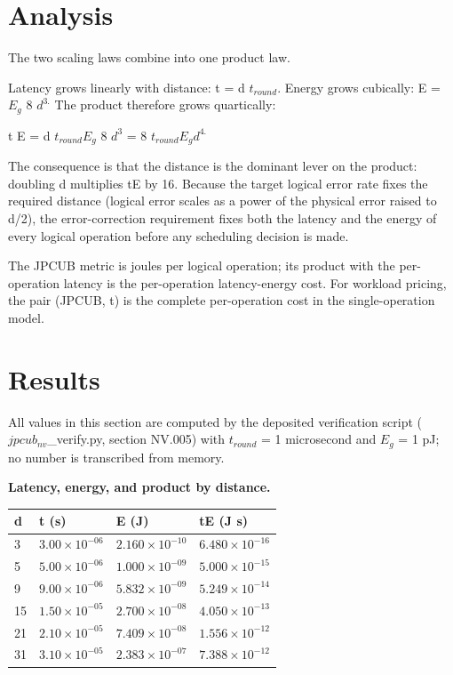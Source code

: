 \documentclass[11pt]{article}
\begin{document}
\section{Analysis}
The two scaling laws combine into one product law.

Latency grows linearly with distance: t = d $t_{round}$. Energy grows cubically: E = $E_{g}$ 8 $d^{3.}$ The product therefore grows quartically:

t E = d $t_{round}   E_{g}$ 8 $d^{3}$ = 8 $t_{round}   E_{g}   d^{4.}$

The consequence is that the distance is the dominant lever on the product: doubling d multiplies tE by 16. Because the target logical error rate fixes the required distance (logical error scales as a power of the physical error raised to d/2), the error-correction requirement fixes both the latency and the energy of every logical operation before any scheduling decision is made.

The JPCUB metric is joules per logical operation; its product with the per-operation latency is the per-operation latency-energy cost. For workload pricing, the pair (JPCUB, t) is the complete per-operation cost in the single-operation model.

\section{Results}
All values in this section are computed by the deposited verification script ($jpcub_{nv}$\_verify.py, section NV.005) with $t_{round}$ = 1 microsecond and $E_{g}$ = 1 pJ; no number is transcribed from memory.

\textbf{Latency, energy, and product by distance.}

\begin{table}[h]
\centering
\begin{tabular}{llll}
\toprule
d & t (s) & E (J) & tE (J s) \\
\midrule
3 & $3.00\times 10^{-06}$ & $2.160\times 10^{-10}$ & $6.480\times 10^{-16}$ \\
5 & $5.00\times 10^{-06}$ & $1.000\times 10^{-09}$ & $5.000\times 10^{-15}$ \\
9 & $9.00\times 10^{-06}$ & $5.832\times 10^{-09}$ & $5.249\times 10^{-14}$ \\
15 & $1.50\times 10^{-05}$ & $2.700\times 10^{-08}$ & $4.050\times 10^{-13}$ \\
21 & $2.10\times 10^{-05}$ & $7.409\times 10^{-08}$ & $1.556\times 10^{-12}$ \\
31 & $3.10\times 10^{-05}$ & $2.383\times 10^{-07}$ & $7.388\times 10^{-12}$ \\
\bottomrule
\end{tabular}
\end{table}
\end{document}
